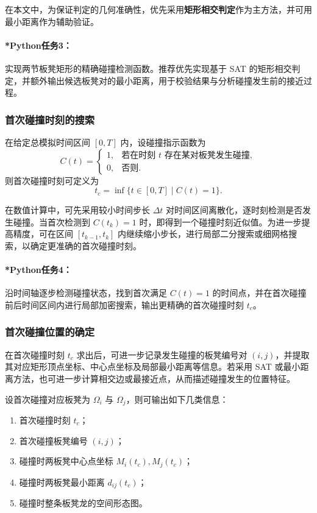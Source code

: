 \documentclass[12pt,a4paper]{ctexart}
\begin{document}
在本文中，为保证判定的几何准确性，优先采用\textbf{矩形相交判定}作为主方法，并可用最小距离作为辅助验证。

\paragraph{*Python任务3：}
实现两节板凳矩形的精确碰撞检测函数。推荐优先实现基于 SAT 的矩形相交判定，并额外输出候选板凳对的最小距离，用于校验结果与分析碰撞发生前的接近过程。

\subsubsection{首次碰撞时刻的搜索}
在给定总模拟时间区间 $[0,T]$ 内，设碰撞指示函数为
\begin{equation}
C(t)=
\begin{cases}
1, & \text{若在时刻 } t \text{ 存在某对板凳发生碰撞},\\
0, & \text{否则}.
\end{cases}
\end{equation}
则首次碰撞时刻可定义为
\begin{equation}
t_c=\inf\{t\in[0,T]\mid C(t)=1\}.
\end{equation}

在数值计算中，可先采用较小时间步长 $\Delta t$ 对时间区间离散化，逐时刻检测是否发生碰撞。当首次检测到 $C(t_k)=1$ 时，即得到一个碰撞时刻近似值。为进一步提高精度，可在区间 $[t_{k-1},t_k]$ 内继续缩小步长，进行局部二分搜索或细网格搜索，以确定更准确的首次碰撞时刻。

\paragraph{*Python任务4：}
沿时间轴逐步检测碰撞状态，找到首次满足 $C(t)=1$ 的时间点，并在首次碰撞前后时间区间内进行局部加密搜索，输出更精确的首次碰撞时刻 $t_c$。

\subsubsection{首次碰撞位置的确定}
在首次碰撞时刻 $t_c$ 求出后，可进一步记录发生碰撞的板凳编号对 $(i,j)$，并提取其对应矩形顶点坐标、中心点坐标及局部最小距离等信息。若采用 SAT 或最小距离方法，也可进一步计算相交边或最接近点，从而描述碰撞发生的位置特征。

设首次碰撞对应板凳为 $\Omega_i$ 与 $\Omega_j$，则可输出如下几类信息：
\begin{enumerate}
    \item 首次碰撞时刻 $t_c$；
    \item 首次碰撞板凳编号 $(i,j)$；
    \item 碰撞时两板凳中心点坐标 $M_i(t_c),M_j(t_c)$；
    \item 碰撞时两板凳最小距离 $d_{ij}(t_c)$；
    \item 碰撞时整条板凳龙的空间形态图。
\end{enumerate}
\end{document}
